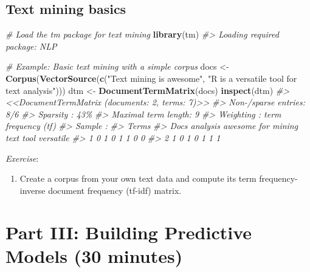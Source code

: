 \documentclass[
]{book}
\newenvironment{Shaded}{\begin{snugshade}}{\end{snugshade}}
\newcommand{\CommentTok}[1]{\textcolor[rgb]{0.56,0.35,0.01}{\textit{#1}}}
\newcommand{\FunctionTok}[1]{\textcolor[rgb]{0.13,0.29,0.53}{\textbf{#1}}}
\newcommand{\NormalTok}[1]{#1}
\newcommand{\OtherTok}[1]{\textcolor[rgb]{0.56,0.35,0.01}{#1}}
\newcommand{\StringTok}[1]{\textcolor[rgb]{0.31,0.60,0.02}{#1}}
\providecommand{\tightlist}{%
  \setlength{\itemsep}{0pt}\setlength{\parskip}{0pt}}
\begin{document}
\section*{Text mining basics}\label{text-mining-basics}

\begin{Shaded}
\begin{Highlighting}[]

\CommentTok{\# Load the \textquotesingle{}tm\textquotesingle{} package for text mining}
\FunctionTok{library}\NormalTok{(tm)}
\CommentTok{\#\textgreater{} Loading required package: NLP}

\CommentTok{\# Example: Basic text mining with a simple corpus}
\NormalTok{docs }\OtherTok{\textless{}{-}} \FunctionTok{Corpus}\NormalTok{(}\FunctionTok{VectorSource}\NormalTok{(}\FunctionTok{c}\NormalTok{(}\StringTok{"Text mining is awesome"}\NormalTok{, }\StringTok{"R is a versatile tool for text analysis"}\NormalTok{)))}
\NormalTok{dtm }\OtherTok{\textless{}{-}} \FunctionTok{DocumentTermMatrix}\NormalTok{(docs)}
\FunctionTok{inspect}\NormalTok{(dtm)}
\CommentTok{\#\textgreater{} \textless{}\textless{}DocumentTermMatrix (documents: 2, terms: 7)\textgreater{}\textgreater{}}
\CommentTok{\#\textgreater{} Non{-}/sparse entries: 8/6}
\CommentTok{\#\textgreater{} Sparsity           : 43\%}
\CommentTok{\#\textgreater{} Maximal term length: 9}
\CommentTok{\#\textgreater{} Weighting          : term frequency (tf)}
\CommentTok{\#\textgreater{} Sample             :}
\CommentTok{\#\textgreater{}     Terms}
\CommentTok{\#\textgreater{} Docs analysis awesome for mining text tool versatile}
\CommentTok{\#\textgreater{}    1        0       1   0      1    1    0         0}
\CommentTok{\#\textgreater{}    2        1       0   1      0    1    1         1}
\end{Highlighting}
\end{Shaded}

\emph{Exercise}:

\begin{enumerate}
\def\labelenumi{\arabic{enumi}.}
\setcounter{enumi}{1}
\tightlist
\item
  Create a corpus from your own text data and compute its term frequency-inverse document frequency (tf-idf) matrix.
\end{enumerate}

\chapter*{Part III: Building Predictive Models (30 minutes)}\label{part-iii-building-predictive-models-30-minutes}
\end{document}

